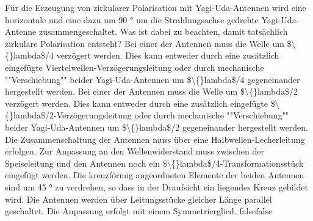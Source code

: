     {Für die Erzeugung von zirkularer Polarisation mit Yagi-Uda-Antennen wird eine horizontale und eine dazu um 90 ° um die Strahlungsachse gedrehte Yagi-Uda-Antenne zusammengeschaltet. Was ist dabei zu beachten, damit tatsächlich zirkulare Polarisation entsteht?}
    {Bei einer der Antennen muss die Welle um \$\textbackslash\{\}lambda\$/4 verzögert werden. Dies kann entweder durch eine zusätzlich eingefügte Viertelwellen-Verzögerungsleitung oder durch mechanische ""Verschiebung"" beider Yagi-Uda-Antennen um \$\textbackslash\{\}lambda\$/4 gegeneinander hergestellt werden.}
    {Bei einer der Antennen muss die Welle um \$\textbackslash\{\}lambda\$/2 verzögert werden. Dies kann entweder durch eine zusätzlich eingefügte \$\textbackslash\{\}lambda\$/2-Verzögerungsleitung oder durch mechanische ""Verschiebung"" beider Yagi-Uda-Antennen um \$\textbackslash\{\}lambda\$/2 gegeneinander hergestellt werden.}
    {Die Zusammenschaltung der Antennen muss über eine Halbwellen-Lecherleitung erfolgen. Zur Anpassung an den Wellenwiderstand muss zwischen der Speiseleitung und den Antennen noch ein \$\textbackslash\{\}lambda\$/4-Transformationsstück eingefügt werden.}
    {Die kreuzförmig angeordneten Elemente der beiden Antennen sind um 45 ° zu verdrehen, so dass in der Draufsicht ein liegendes Kreuz gebildet wird. Die Antennen werden über Leitungsstücke gleicher Länge parallel geschaltet. Die Anpassung erfolgt mit einem Symmetrierglied.}
    {false}{false}